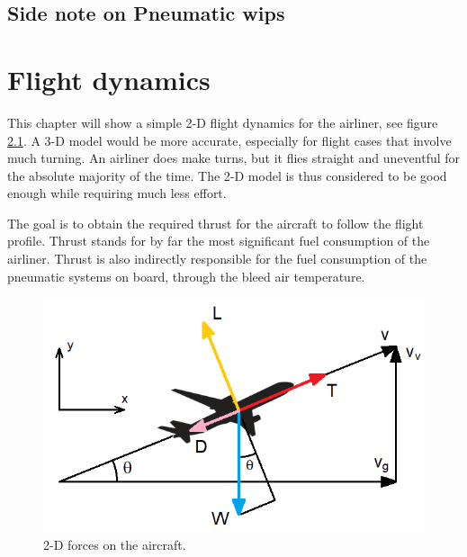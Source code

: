 \documentclass[english]{kththesis}
\begin{document}
\clearpage







\section{Side note on Pneumatic \acrshort{wips}}

\cleardoublepage
\chapter{Flight dynamics}
\label{ch:flightdynamics}

This chapter will show a simple 2-D flight dynamics for the airliner, see figure \ref{fig:FlightForces}. A 3-D model would be more accurate, especially for flight cases that involve much turning. An airliner does make turns, but it flies straight and uneventful for the absolute majority of the time. The 2-D model is thus considered to be good enough while requiring much less effort.

The goal is to obtain the required thrust for the aircraft to follow the flight profile.
Thrust stands for by far the most significant fuel consumption of the airliner. Thrust is also indirectly responsible for the fuel consumption of the pneumatic systems on board, through the bleed air temperature.

\begin{figure}[!ht]
    \centering
    \includegraphics[width=1\textwidth]{Epictures/FlightDynamicsForces.png}
    \caption{2-D forces on the aircraft.}
    \label{fig:FlightForces}
\end{figure}
\end{document}
